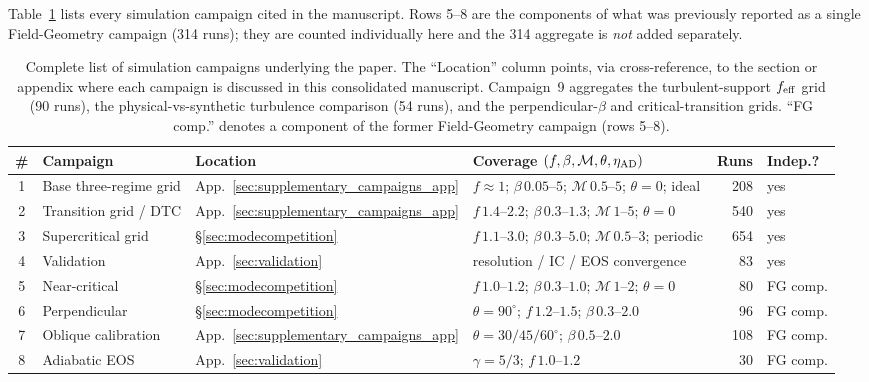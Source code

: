 \documentclass[usenatbib,twoside,twocolumn]{mnras}
\begin{document}
Table~\ref{tab:campaigns} lists every simulation campaign cited in the manuscript. Rows 5--8 are the components of what was previously reported as a single Field-Geometry campaign (314 runs); they are counted individually here and the 314 aggregate is \emph{not} added separately.

\begin{table}
\caption{Complete list of simulation campaigns underlying the paper. The ``Location'' column points, via cross-reference, to the section or appendix where each campaign is discussed in this consolidated manuscript. Campaign~9 aggregates the turbulent-support $f_{\rm eff}$ grid (90 runs), the physical-vs-synthetic turbulence comparison (54 runs), and the perpendicular-$\beta$ and critical-transition grids. ``FG comp.'' denotes a component of the former Field-Geometry campaign (rows 5--8).}
\label{tab:campaigns}
\footnotesize
\setlength{\tabcolsep}{4pt}
\renewcommand{\arraystretch}{1.2}
\begin{tabular}{@{}c p{3.4cm} l p{4.0cm} r l@{}}
\toprule
\# & Campaign & Location & Coverage $(f,\beta,\mathcal{M},\theta,\eta_{\rm AD})$ & Runs & Indep.? \\
\midrule
1  & Base three-regime grid & App.~\ref{sec:supplementary_campaigns_app} & $f\approx1$; $\beta\,0.05$--$5$; $\mathcal{M}\,0.5$--$5$; $\theta=0$; ideal & 208 & yes \\
2  & Transition grid / DTC & App.~\ref{sec:supplementary_campaigns_app} & $f\,1.4$--$2.2$; $\beta\,0.3$--$1.3$; $\mathcal{M}\,1$--$5$; $\theta=0$ & 540 & yes \\
3  & Supercritical grid & \S\ref{sec:modecompetition} & $f\,1.1$--$3.0$; $\beta\,0.3$--$5.0$; $\mathcal{M}\,0.5$--$3$; periodic & 654 & yes \\
4  & Validation & App.~\ref{sec:validation} & resolution / IC / EOS convergence & 83 & yes \\
5  & Near-critical & \S\ref{sec:modecompetition} & $f\,1.0$--$1.2$; $\beta\,0.3$--$1.0$; $\mathcal{M}\,1$--$2$; $\theta=0$ & 80 & FG comp. \\
6  & Perpendicular & \S\ref{sec:modecompetition} & $\theta=90^\circ$; $f\,1.2$--$1.5$; $\beta\,0.3$--$2.0$ & 96 & FG comp. \\
7  & Oblique calibration & App.~\ref{sec:supplementary_campaigns_app} & $\theta=30/45/60^\circ$; $\beta\,0.5$--$2.0$ & 108 & FG comp. \\
8  & Adiabatic EOS & App.~\ref{sec:validation} & $\gamma=5/3$; $f\,1.0$--$1.2$ & 30 & FG comp. \\

\end{tabular}
\end{table}
\end{document}
